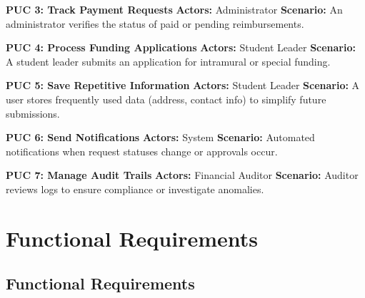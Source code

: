 \documentclass[12pt]{article}
\begin{document}
\textbf{PUC 3: Track Payment Requests}  
\textbf{Actors:} Administrator  
\textbf{Scenario:} An administrator verifies the status of paid or pending reimbursements.

\textbf{PUC 4: Process Funding Applications}  
\textbf{Actors:} Student Leader  
\textbf{Scenario:} A student leader submits an application for intramural or special funding.

\textbf{PUC 5: Save Repetitive Information}  
\textbf{Actors:} Student Leader  
\textbf{Scenario:} A user stores frequently used data (address, contact info) to simplify future submissions.

\textbf{PUC 6: Send Notifications}  
\textbf{Actors:} System  
\textbf{Scenario:} Automated notifications when request statuses change or approvals occur.

\textbf{PUC 7: Manage Audit Trails}  
\textbf{Actors:} Financial Auditor  
\textbf{Scenario:} Auditor reviews logs to ensure compliance or investigate anomalies.

\section{Functional Requirements}
\subsection{Functional Requirements}
\end{document}
